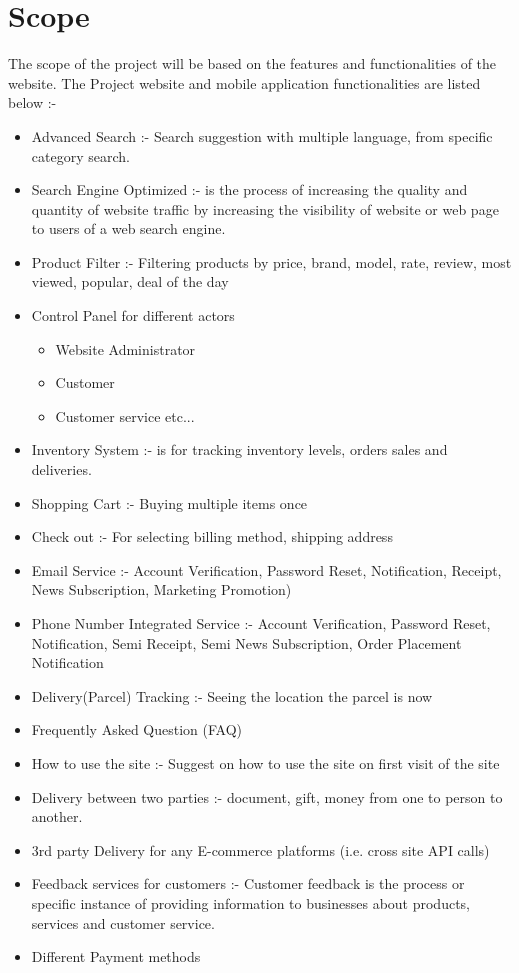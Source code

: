 \section{Scope}
The scope of the project will be based on the features and functionalities of the website. The Project website and mobile application functionalities are listed below :-
\begin{itemize}
	\item Advanced Search :- Search suggestion with multiple language, from specific category search. 
	\item Search Engine Optimized :- is the process of increasing the quality and quantity of website traffic by increasing the visibility of website or web page to users of a web search engine.
	\item Product Filter :- Filtering products by price, brand, model, rate, review, most viewed, popular, deal of the day
	\item Control Panel for different actors
	\begin{itemize}
	    \item Website Administrator
	    \item Customer
	    \item Customer service etc...
    	\end{itemize}
	\item Inventory System :- is for tracking inventory levels, orders sales and deliveries.
	\item Shopping Cart	 :- Buying multiple items once
	\item Check out :- For selecting billing method, shipping address
	\item Email Service :- Account Verification, Password Reset, Notification, Receipt, News Subscription, Marketing Promotion)
	\item Phone Number Integrated Service :- Account Verification, Password Reset, Notification, Semi Receipt, Semi News Subscription, Order Placement  Notification
	\item Delivery(Parcel) Tracking :- Seeing the location the parcel is now
	\item Frequently Asked Question (FAQ)
	\item How to use the site :- Suggest on how to use the site on first visit of the site
	\item Delivery between two parties :- document, gift, money from one to person to another.
	\item 3rd party Delivery for any E-commerce platforms (i.e. cross site API calls)
	\item Feedback services for customers :- Customer feedback is the process or specific instance of providing information to businesses about products, services and customer service.
	\item Different Payment methods
\end{itemize}

